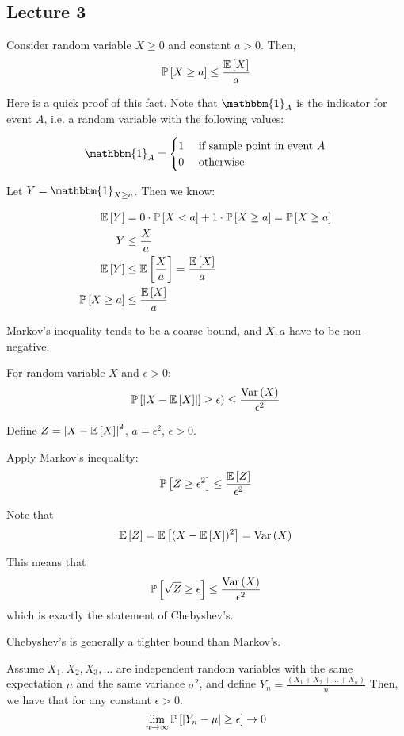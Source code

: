 \subsection{Lecture 3}

\begin{theorem} 
    Consider random variable $X \geq 0$ and constant $a > 0$. Then,
    \[ \mathbb{P}\left[ X \geq a \right] \leq \frac{\mathbb{E}\left[ X \right]}{a} \]
\end{theorem}

Here is a quick proof of this fact. Note that $\mathbbm{1}_A$
is the indicator for event $A$, i.e. a random variable with the following values:

\[ \mathbbm{1}_A = 
\begin{cases}
   1 & \text{ if sample point in event $A$} \\
   0 & \text{ otherwise}
\end{cases}
\]

Let $Y = \mathbbm{1}_{X \geq a}$. Then we know:

\begin{align*}
    \mathbb{E}\left[ Y \right] &= 0 \cdot \mathbb{P}\left[ X < a \right] + 1 \cdot \mathbb{P}\left[ X \geq a \right] = \mathbb{P}\left[ X \geq a \right] \\
    Y &\leq \frac{X}{a} \\
    \mathbb{E}\left[ Y \right] &\leq \mathbb{E}\left[ \frac{X}{a} \right] = \frac{\mathbb{E}\left[ X \right]}{a} \\
    \mathbb{P}\left[ X \geq a \right] &\leq \frac{\mathbb{E}\left[ X \right]}{a}
\end{align*}

Markov's inequality tends to be a coarse bound, and $X, a$ have to be non-negative.

\begin{theorem} 
    For random variable $X$ and $\epsilon > 0$:
    \[ \mathbb{P}\left[ \abs{X - \mathbb{E}\left[ X \right]} \right] \geq \epsilon) \leq \frac{\text{Var}\left( X \right)}{\epsilon^2} \]
\end{theorem}

Define $Z = \abs{X - \mathbb{E}\left[ X \right]}^2$, $a = \epsilon^2$, $\epsilon > 0$.

Apply Markov's inequality:
\[ \mathbb{P}\left[ Z \geq \epsilon^2 \right] \leq \frac{\mathbb{E}\left[ Z \right]}{\epsilon^2} \]

Note that \[\mathbb{E}\left[ Z \right] = \mathbb{E}\left[ (X - \mathbb{E}\left[ X \right])^2 \right] = \text{Var}\left( X \right) \]

This means that \[ \mathbb{P}\left[ \sqrt{Z} \geq \epsilon \right] \leq \frac{\text{Var}\left( X \right)}{\epsilon^2} \]
which is exactly the statement of Chebyshev's.

Chebyshev's is generally a tighter bound than Markov's.

\begin{theorem}
    Assume $X_1, X_2, X_3, \dots$ are independent random variables with the same expectation
    $\mu$ and the same variance $\sigma^2$, and define $Y_n = \frac{(X_1 + X_2 + \dots + X_n)}{n}$
    Then, we have that for any constant $\epsilon > 0$.
    \[ \lim_{n \to \infty} \mathbb{P}\left[ \abs{Y_n - \mu} \geq \epsilon \right] \to 0 \]
\end{theorem}

